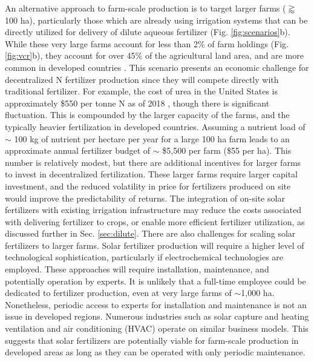 An alternative approach to farm-scale production is to target larger farms ($\gtrapprox$ 100 ha), particularly those which are already using irrigation systems that can be directly utilized for delivery of dilute aqueous fertilizer (Fig. \ref{fig:scenarios}b). While these very large farms account for less than 2\% of farm holdings (Fig. \ref{fig:vcr}b), they account for over 45\% of the agricultural land area, and are more common in developed countries \cite{Lowder_2016}. This scenario presents an economic challenge for decentralized N fertilizer production since they will compete directly with traditional fertilizer. For example, the cost of urea in the United States is approximately \$550 per tonne N as of 2018 \cite{Argus_Feb}, though there is significant fluctuation. This is compounded by the larger capacity of the farms, and the typically heavier fertilization in developed countries. Assuming a nutrient load of $\sim$ 100 kg of nutrient per hectare per year for a large 100 ha farm leads to an approximate annual fertilizer budget of $\sim$ \$5,500 per farm (\$55 per ha). This number is relatively modest, but there are additional incentives for larger farms to invest in decentralized fertilization. These larger farms require larger capital investment, and the reduced volatility in price for fertilizers produced on site would improve the predictability of returns. The integration of on-site solar fertilizers with existing irrigation infrastructure may reduce the costs associated with delivering fertilizer to crops, or enable more efficient fertilizer utilization, as discussed further in Sec. \ref{sec:dilute}. There are also challenges for scaling solar fertilizers to larger farms. Solar fertilizer production will require a higher level of technological sophistication, particularly if electrochemical technologies are employed. These approaches will require installation, maintenance, and potentially operation by experts. It is unlikely that a full-time employee could be dedicated to fertilizer production, even at very large farms of $\sim$1,000 ha. Nonetheless, periodic access to experts for installation and maintenance is not an issue in developed regions. Numerous industries such as solar capture and heating ventilation and air conditioning (HVAC) operate on similar business models. This suggests that solar fertilizers are potentially viable for farm-scale production in developed areas as long as they can be operated with only periodic maintenance.

